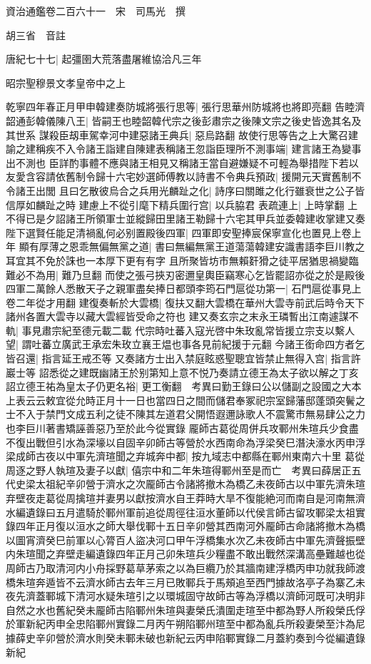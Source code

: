 資治通鑑卷二百六十一　宋　司馬光　撰

胡三省　音註

唐紀七十七|{
	起彊圉大荒落盡屠維協洽凡三年}


昭宗聖穆景文孝皇帝中之上

乾寧四年春正月甲申韓建奏防城將張行思等|{
	張行思華州防城將也將即亮翻}
告睦濟韶通彭韓儀陳八王|{
	皆嗣王也睦韶韓代宗之後彭肅宗之後陳文宗之後史皆逸其名及其世系}
謀殺臣刼車駕幸河中建惡諸王典兵|{
	惡烏路翻}
故使行思等告之上大驚召建諭之建稱疾不入令諸王詣建自陳建表稱諸王忽詣臣理所不測事端|{
	建言諸王為變事出不測也}
臣詳酌事體不應與諸王相見又稱諸王當自避嫌疑不可輕為舉措陛下若以友愛含容請依舊制令歸十六宅妙選師傅教以詩書不令典兵預政|{
	援開元天實舊制不令諸王出閭}
且曰乞散彼烏合之兵用光麟趾之化|{
	詩序曰關雎之化行雖衰世之公子皆信厚如麟趾之時}
建慮上不從引麾下精兵圍行宫|{
	以兵脇君}
表疏連上|{
	上時掌翻}
上不得已是夕詔諸王所領軍士並縱歸田里諸王勒歸十六宅其甲兵並委韓建收掌建又奏陛下選賢任能足清禍亂何必别置殿後四軍|{
	四軍即安聖捧宸保寧宣化也置見上卷上年}
顯有厚薄之恩乖無偏無黨之道|{
	書曰無編無黨王道蕩蕩韓建安識書語李巨川教之耳宜其不免於誅也一本厚下更有有字}
且所聚皆坊市無賴姧猾之徒平居猶思禍變臨難必不為用|{
	難乃旦翻}
而使之張弓挾刃密邇皇輿臣竊寒心乞皆罷詔亦從之於是殿後四軍二萬餘人悉散天子之親軍盡矣捧日都頭李筠石門扈從功第一|{
	石門扈從事見上卷二年從才用翻}
建復奏斬於大雲橋|{
	復扶又翻大雲橋在華州大雲寺前武后時令天下諸州各置大雲寺以藏大雲經皆受命之符也}
建又奏玄宗之末永王璘暫出江南遽謀不軌|{
	事見肅宗紀至德元載二載}
代宗時吐蕃入寇光啓中朱玫亂常皆援立宗支以繫人望|{
	謂吐蕃立廣武王承宏朱玫立襄王煴也事各見前紀援于元翻}
今諸王銜命四方者乞皆召還|{
	指言延王戒丕等}
又奏諸方士出入禁庭眩惑聖聰宜皆禁止無得入宫|{
	指言許巖士等}
詔悉從之建既幽諸王於别第知上意不悦乃奏請立德王為太子欲以解之丁亥詔立德王祐為皇太子仍更名裕|{
	更工衡翻　考異曰勤王錄曰公以儲副之設國之大本上表云云敕宜從允時正月十一日也當四日之間而儲君奉冢祀宗室歸藩邸蓬頭突鬢之士不入于禁門文成五利之徒不陳其左道君父開悟遐邇詠歌人不震驚市無易肆公之力也李巨川著書矯誣善惡乃至於此今從實錄}
龎師古葛從周併兵攻鄆州朱瑄兵少食盡不復出戰但引水為深壕以自固辛卯師古等營於水西南命為浮梁癸巳潛決濠水丙申浮梁成師古夜以中軍先濟瑄聞之弃城奔中都|{
	按九域志中都縣在鄆州東南六十里}
葛從周逐之野人執瑄及妻子以獻|{
	僖宗中和二年朱瑄得鄆州至是而亡　考異曰薛居正五代史梁太祖紀辛卯營于濟水之次龎師古令諸將撤木為橋乙未夜師古以中軍先濟朱瑄弃壁夜走葛從周擒瑄并妻男以獻按濟水自王莽時大旱不復能絶河而南自是河南無濟水編遺錄曰五月遣騎於鄆州軍前追從周徑往洹水董師以代侯言師古留攻鄆梁太祖實錄四年正月復以洹水之師大舉伐鄆十五日辛卯營其西南河外龎師古命諸將撤木為橋以圖宵濟癸巳前軍以心膂百人盜决河口甲午浮橋集水次乙未夜師古中軍先濟聲振壁内朱瑄聞之弃壁走編遺錄四年正月己卯朱瑄兵少糧盡不敢出戰然深溝高壘難越也從周師古乃取清河内小舟採野葛草茅索之以為巨纜乃於其牆南建浮橋丙申功就我師渡橋朱瑄奔遁皆不云濟水師古去年三月已敗鄆兵于馬頰追至西門據故洛亭子為寨乙未夜先濟蓋鄆城下清河水疑朱瑄引之以環城固守故師古等為浮橋以濟師河既可决明非自然之水也舊紀癸未龎師古陷鄆州朱瑄與妻榮氏潰圍走瑄至中都為野人所殺榮氏俘於軍新紀丙申全忠陷鄆州實錄二月丙午朔陷鄆州瑄至中都為亂兵所殺妻榮至汴為尼據薛史辛卯營於濟水則癸未鄆未破也新紀云丙申陷鄆實錄二月蓋約奏到今從編遺錄新紀}
